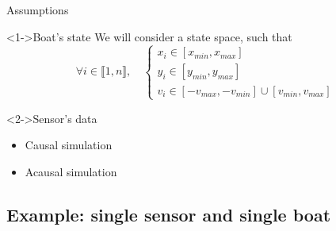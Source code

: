 \documentclass{beamer}
\begin{document}
            \begin{frame}{Assumptions}
                \begin{block}<1->{Boat's state}
                    We will consider a state space, such that
                    \begin{equation}
                        \forall i \in \llbracket 1, n\rrbracket, \quad \begin{cases}x_i \in [x_{min}, x_{max}] \\ y_i \in [y_{min}, y_{max}] \\ v_i \in [-v_{max}, -v_{min}] \cup [v_{min}, v_{max}] \end{cases}
                    \end{equation}
                \end{block}
                \begin{block}<2->{Sensor's data}
                    \begin{itemize}
                        \item Causal simulation
                        \item Acausal simulation
                    \end{itemize}
                \end{block}
            \end{frame}
        
        \subsection{Example: single sensor and single boat}
\end{document}
